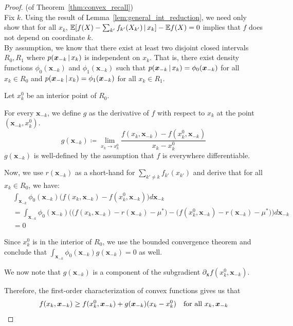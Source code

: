 \begin{proof} (of Theorem~\ref{thm:convex_recall})\\
Fix $k$. Using the result of Lemma~\ref{lem:general_int_reduction}, we need only show that for all $x_k$, $ {\mathbb E}[ f(X) - \sum_{k'} f_{k'}(X_{k'}) {\,|\,} x_k] - {\mathbb E} f(X) = 0 $ implies that $f$ does not depend on coordinate $k$.\\

By assumption, we know that there exist at least two disjoint closed intervals $R_0, R_1$ where $p(\mbox{\boldmath $x$}_{-k} {\,|\,} x_k)$ is independent on $x_k$. That is, there exist density functions $\phi_0(\mathbf{x}_{-k})$ and $\phi_1(\mathbf{x}_{-k})$ such that $p(\mbox{\boldmath $x$}_{-k} {\,|\,} x_k) = \phi_0(\mbox{\boldmath $x$}_{-k})$ for all $x_k \in R_0$ and $p(\mbox{\boldmath $x$}_{-k} {\,|\,} x_k) = \phi_1(\mbox{\boldmath $x$}_{-k})$ for all $x_k \in R_1$.


Let $x^0_k$ be an interior point of $R_0$. 

For every $\mathbf{x}_{-k}$, we define $g$ as the derivative of $f$ with respect to $x_k$ at the point $(\mathbf{x}_{-k}, x^0_k)$.
\[
g(\mathbf{x}_{-k}) \coloneqq  \lim_{x_k \rightarrow x^0_k} 
     \frac{f(x_k, \mathbf{x}_{-k}) - f(x^0_k, \mathbf{x}_{-k})}{x_k - x^0_k}
\]
$g(\mathbf{x}_{-k})$ is well-defined by the assumption that $f$ is everywhere differentiable.

Now, we use $r(\mathbf{x}_{-k})$ as a short-hand for $\sum_{k'\neq k} f_{k'}(x_{k'})$ and derive that for all $x_k \in R_0$, we have:
\begin{align*} 
& \int_{\mathbf{x}_{-k}}  \phi_0(\mathbf{x}_{-k}) 
   \Big( f(x_k, \mathbf{x}_{-k}) - f(x_k^0, \mathbf{x}_{-k}) \Big) d\mathbf{x}_{-k} \\
 &= \int_{\mathbf{x}_{-k}}  \phi_0(\mathbf{x}_{-k})
   \Big( \big(f(x_k, \mathbf{x}_{-k}) - r(\mathbf{x}_{-k}) - \mu^* \big) - 
         \big(f(x^0_k, \mathbf{x}_{-k}) - r(\mathbf{x}_{-k}) - \mu^* \big) \Big)
     d \mathbf{x}_{-k} \\
 &= 0
\end{align*}

Since $x^0_k$ is in the interior of $R_0$, we use the bounded convergence theorem and conclude that $\int_{\mathbf{x}_{-k}} \phi_0( \mathbf{x}_{-k}) g(\mathbf{x}_{-k}) = 0$ as well.

We now note that $g(\mathbf{x}_{-k})$ is a component of the subgradient 
$\partial_{\mathbf{x}} f(x^0_k, \mathbf{x}_{-k})$. 

Therefore, the first-order characterization of convex functions gives us that
\begin{align*}
f(x_k, \mbox{\boldmath $x$}_{-k}) \geq f(x^0_k, \mbox{\boldmath $x$}_{-k}) + g(\mbox{\boldmath $x$}_{-k}) (x_k - x^0_k)
   \quad \textrm{for all } x_k, \mbox{\boldmath $x$}_{-k}
\end{align*}


\end{proof}
